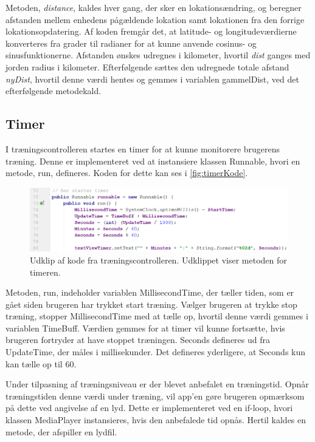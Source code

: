 Metoden, \textit{distance}, kaldes hver gang, der sker en lokationsændring, og beregner afstanden mellem enhedens pågældende lokation samt lokationen fra den forrige lokationsopdatering. Af koden fremgår det, at latitude- og longitudeværdierne konverteres fra grader til radianer for at kunne anvende cosinus- og sinusfunktionerne. 
Afstanden ønskes udregnes i kilometer, hvortil \textit{dist} ganges med jorden radius i kilometer. 
Efterfølgende sættes den udregnede totale afstand \textit{nyDist}, hvortil denne værdi hentes og gemmes i variablen gammelDist, ved det efterfølgende metodekald.   





\subsection{Timer}
I træningscontrolleren startes en timer for at kunne monitorere brugerens træning. Denne er implementeret ved at instansiere klassen Runnable, hvori en metode, run, defineres. Koden for dette kan ses i \autoref{fig:timerKode}.

\begin{figure} [H]
\centering
\includegraphics[width=1\textwidth]{figures/imple/timerKode}
\caption{Udklip af kode fra træningscontrolleren. Udklippet viser metoden for timeren.}
\label{fig:timerKode}
\end{figure} 

\noindent
Metoden, run, indeholder variablen MillisecondTime, der tæller tiden, som er gået siden brugeren har trykket start træning. Vælger brugeren at trykke stop træning, stopper MillisecondTime med at tælle op, hvortil denne værdi gemmes i variablen TimeBuff.  Værdien gemmes for at timer vil kunne fortsætte, hvis brugeren fortryder at have stoppet træningen. Seconds defineres ud fra UpdateTime, der måles i millisekunder. Det defineres yderligere, at Seconds kun kan tælle op til 60.

Under tilpasning af træningsniveau er der blevet anbefalet en træningstid. Opnår træningstiden denne værdi under træning, vil app'en gøre brugeren opmærksom på dette ved angivelse af en lyd. Dette er implementeret ved en if-loop, hvori klassen MediaPlayer instansieres, hvis den anbefalede tid opnås. Hertil kaldes en metode, der afspiller en lydfil. 



